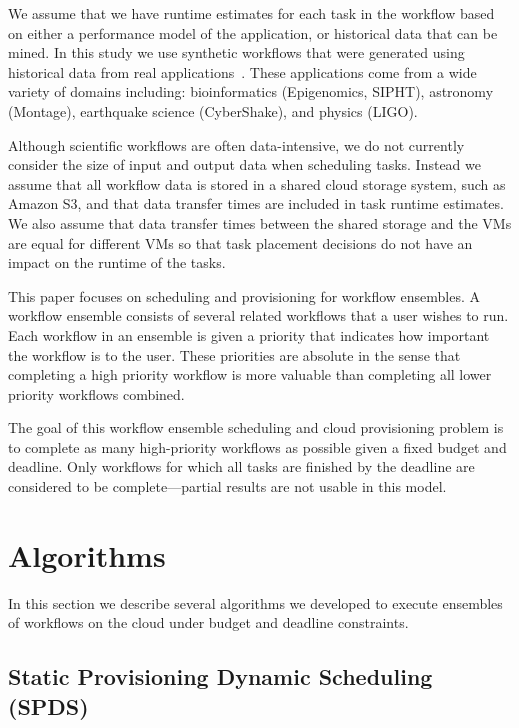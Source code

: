 \documentclass{sig-alternate}
\begin{document}
We assume that we have runtime estimates for each task in the workflow based on
either a performance model of the application, or historical data that can be
mined. In this study we use synthetic workflows that were generated using 
historical data from real applications~\cite{Bharathi08}. These applications 
come from a wide variety of domains including: bioinformatics (Epigenomics, 
SIPHT), astronomy (Montage), earthquake science (CyberShake), and physics 
(LIGO).


Although scientific workflows are often data-intensive, we do not currently
consider the size of input and output data when scheduling tasks. Instead we
assume that all workflow data is stored in a shared cloud storage system, such
as Amazon S3, and that data transfer times are included in task runtime
estimates. We also assume that data transfer times between the shared storage
and the VMs are equal for different VMs so that task placement decisions do not
have an impact on the runtime of the tasks.


This paper focuses on scheduling and provisioning for workflow ensembles. A
workflow ensemble consists of several related workflows that a user wishes to
run. Each workflow in an ensemble is given a priority that indicates how
important the workflow is to the user. These priorities are absolute in the 
sense that completing a high priority workflow is more valuable than 
completing all lower priority workflows combined.


The goal of this workflow ensemble scheduling and cloud provisioning problem is
to complete as many high-priority workflows as possible given a fixed budget and
deadline. Only workflows for which all tasks are finished by the deadline are 
considered to be complete---partial results are not usable in this model.


\section{Algorithms}
\label{sec:algorithms}

In this section we describe several algorithms we developed to execute ensembles of
workflows on the cloud under budget and deadline constraints.

\subsection{Static Provisioning Dynamic Scheduling \\
(SPDS) }
\label{sec:spds}
\end{document}
